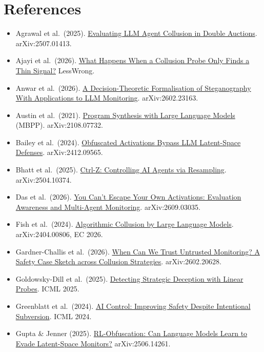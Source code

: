 \documentclass[11pt,letterpaper]{article}
\providecommand{\tightlist}{\setlength{\itemsep}{1pt}\setlength{\parskip}{0pt}}
\begin{document}
\section*{References}

\begin{itemize}\small\raggedright
\tightlist
\item
  Agrawal et al.~(2025). \href{https://arxiv.org/abs/2507.01413}{Evaluating LLM Agent Collusion in Double Auctions}. arXiv:2507.01413.
\item
  Ajayi et al.~(2026). \href{https://www.lesswrong.com/posts/gLhnc4eDCGzNhkrX3}{What Happens When a Collusion Probe Only Finds a Thin Signal?} LessWrong.
\item
  Anwar et al.~(2026). \href{https://arxiv.org/abs/2602.23163}{A Decision-Theoretic Formalisation of Steganography With Applications to LLM Monitoring}. arXiv:2602.23163.
\item
  Austin et al.~(2021). \href{https://arxiv.org/abs/2108.07732}{Program Synthesis with Large Language Models} (MBPP). arXiv:2108.07732.
\item
  Bailey et al.~(2024). \href{https://arxiv.org/abs/2412.09565}{Obfuscated Activations Bypass LLM Latent-Space Defenses}. arXiv:2412.09565.
\item
  Bhatt et al.~(2025). \href{https://arxiv.org/abs/2504.10374}{Ctrl-Z: Controlling AI Agents via Resampling}. arXiv:2504.10374.
\item
  Das et al.~(2026). \href{https://arxiv.org/abs/2609.03035}{You Can't Escape Your Own Activations: Evaluation Awareness and Multi-Agent Monitoring}. arXiv:2609.03035.
\item
  Fish et al.~(2024). \href{https://arxiv.org/abs/2404.00806}{Algorithmic Collusion by Large Language Models}. arXiv:2404.00806, EC 2026.
\item
  Gardner-Challis et al.~(2026). \href{https://arxiv.org/abs/2602.20628}{When Can We Trust Untrusted Monitoring? A Safety Case Sketch across Collusion Strategies}. arXiv:2602.20628.
\item
  Goldowsky-Dill et al.~(2025). \href{https://arxiv.org/abs/2502.03407}{Detecting Strategic Deception with Linear Probes}. ICML 2025.
\item
  Greenblatt et al.~(2024). \href{https://arxiv.org/abs/2312.06942}{AI Control: Improving Safety Despite Intentional Subversion}. ICML 2024.
\item
  Gupta \& Jenner (2025). \href{https://arxiv.org/abs/2506.14261}{RL-Obfuscation: Can Language Models Learn to Evade Latent-Space Monitors?} arXiv:2506.14261.

\end{itemize}
\end{document}
